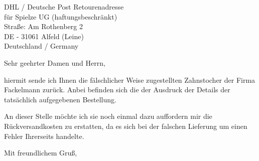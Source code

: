 \documentclass[
    absender,
    paper=a4,
    version=last,
    fontsize=11pt,
    DIV=13,
    BCOR=0mm]{scrlttr2}
\begin{document}


\begin{letter}{%
DHL / Deutsche Post Retourenadresse\\ %
für Spielze UG (haftungsbeschränkt)\\ %
Straße: Am Rothenberg 2\\ %
DE - 31061 Alfeld (Leine)\\ %
Deutschland / Germany
}
\opening{Sehr geehrter Damen und Herrn,}

hiermit sende ich Ihnen die fälschlicher Weise zugestellten 
Zahnstocher der Firma Fackelmann zurück.
Anbei befinden sich die der Ausdruck der Details
der tatsächlich aufgegebenen Bestellung.

An dieser Stelle möchte ich sie noch einmal dazu auffordern
mir die Rückversandkosten zu erstatten, da es sich bei der 
falschen Lieferung um einen Fehler Ihrerseits handelte. 



\closing{Mit freundlichem Gruß,}

\end{letter}
\end{document}
